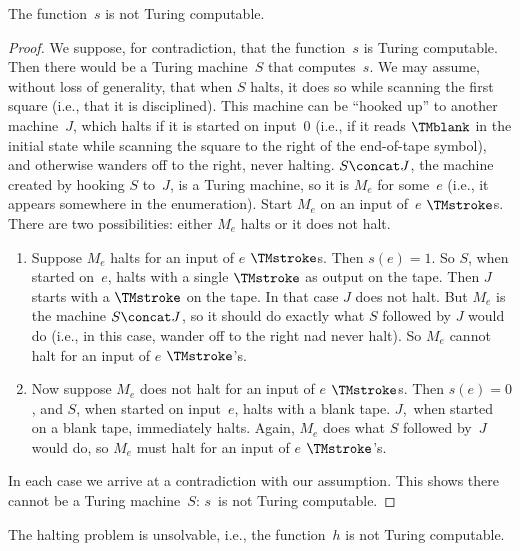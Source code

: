 \documentclass[../../../include/open-logic-section]{subfiles}
\begin{document}
\begin{lem}
The function~$s$ is not Turing computable.
\end{lem}

\begin{proof}
We suppose, for contradiction, that the function~$s$ is Turing
computable.  Then there would be a Turing machine~$S$ that
computes~$s$. We may assume, without loss of generality, that when $S$
halts, it does so while scanning the first square (i.e., that it is
disciplined).  This machine can be ``hooked up'' to another
machine~$J$, which halts if it is started on input~$0$ (i.e., if it
reads $\TMblank$ in the initial state while scanning the square to the
right of the end-of-tape symbol), and otherwise wanders off to the
right, never halting. $S \concat J$, the machine created by hooking
$S$ to~$J$, is a Turing machine, so it is $M_e$ for some~$e$ (i.e., it
appears somewhere in the enumeration). Start $M_e$ on an input of~$e$
$\TMstroke$s. There are two possibilities: either $M_e$ halts or it
does not halt.
\begin{enumerate}
\item Suppose $M_e$ halts for an input of $e$ $\TMstroke$s. Then $s(e)
  = 1$. So $S$, when started on~$e$, halts with a single $\TMstroke$
  as output on the tape.  Then $J$ starts with a $\TMstroke$ on the
  tape. In that case $J$ does not halt. But $M_e$ is the machine $S
  \concat J$, so it should do exactly what $S$ followed by $J$ would
  do (i.e., in this case, wander off to the right nad never halt).  So
  $M_e$ cannot halt for an input of $e$ $\TMstroke$'s.

\item Now suppose $M_e$ does not halt for an input of $e$
  $\TMstroke$s.  Then $s(e) = 0$, and $S$, when started on input~$e$,
  halts with a blank tape.  $J$,~when started on a blank tape,
  immediately halts.  Again, $M_e$ does what $S$ followed by~$J$ would
  do, so $M_e$ must halt for an input of $e$ $\TMstroke$'s.
\end{enumerate}
In each case we arrive at a contradiction with our assumption. This
shows there cannot be a Turing machine~$S$: $s$~is not Turing
computable.
\end{proof}


\begin{thm}
 The halting problem is unsolvable, i.e.,
the function~$h$ is not Turing computable.
\end{thm}
\end{document}
